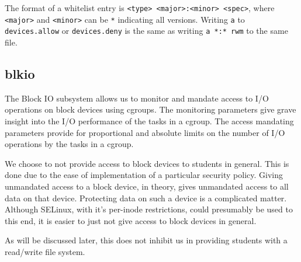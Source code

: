 The format of a whitelist entry is \texttt{<type> <major>:<minor> <spec>},
where \texttt{<major>} and \texttt{<minor>} can be \texttt{*} indicating all
versions. Writing \texttt{a} to \texttt{devices.allow} or \texttt{devices.deny}
is the same as writing \texttt{a *:* rwm} to the same file.

\subsection{blkio}

The Block IO subsystem allows us to monitor and mandate access to I/O
operations on block devices using cgroups\cite{blkio-controller.txt}. The
monitoring parameters give grave insight into the I/O performance of the tasks
in a cgroup. The access mandating parameters provide for proportional and
absolute limits on the number of I/O operations by the tasks in a cgroup.

We choose to not provide access to block devices to students in general. This
is done due to the ease of implementation of a particular security policy.
Giving unmandated access to a block device, in theory, gives unmandated access
to all data on that device. Protecting data on such a device is a complicated
matter. Although SELinux, with it's per-inode restrictions, could presumably be
used to this end, it is easier to just not give access to block devices in
general.

As will be discussed later, this does not inhibit us in providing students with
a read/write file system.
